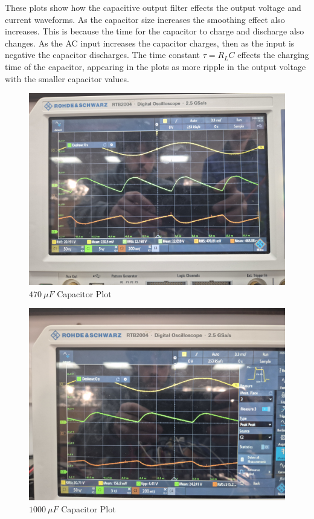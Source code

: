 \documentclass[12pt,a4paper]{article}
\begin{document}
These plots show how the capacitive output filter effects the output voltage and current waveforms. As the capacitor size increases the smoothing effect also increases. This is because the time for the capacitor to charge and discharge also changes. As the AC input increases the capacitor charges, then as the input is negative the capacitor discharges. The time constant $\tau=R_LC$ effects the charging time of the capacitor, appearing in the plots as more ripple in the output voltage with the smaller capacitor values.\\
\begin{figure}[H]
        \centering
	\includegraphics[width=0.7\columnwidth]{Images/20250828_134829.jpg}
	\caption{$470\:\mu F$ Capacitor Plot}
	\label{fig:470F Cap Plot}
\end{figure}
\begin{figure}[H]
        \centering
	\includegraphics[width=0.7\columnwidth]{Images/20250828_135102.jpg}
	\caption{$1000\:\mu F$ Capacitor Plot}
	\label{fig:1000F Cap Plot}
\end{figure}
\end{document}
